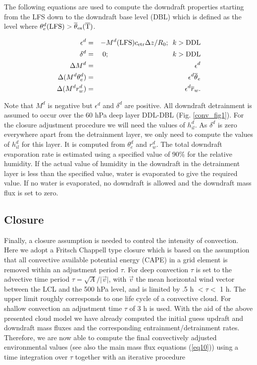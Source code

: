 The following equations are used to compute the downdraft properties
starting from the LFS down to the downdraft base level (DBL)
which is defined as the level where
$\theta_{e}^d(\rm{LFS}) >\overline{\theta}_{es}(\overline{T})$.


\begin{eqnarray}
\epsilon^d&=&-M^d({\rm LFS}) c_{\rm etr} \Delta z/R_0;\,\,\, k>{\rm DDL}\\
\delta^d&=&0; \quad\quad\quad\quad\quad\quad\quad\quad\quad\, k>{\rm DDL}\\
\Delta M^d&=&\epsilon^d\\
\Delta (M^d\theta_e^d)&=&\epsilon^d\overline{\theta}_e
\label{eqdt} \\
\Delta (M^d r_w^d)&=&\epsilon^d\overline{r}_w.
\label{eqdq}
\end{eqnarray}

\noindent
Note that $M^d$ is negative but $\epsilon^d$ and $\delta^d$ are positive.
All downdraft detrainment is assumed to occur over the 60 hPa
deep layer DDL-DBL (Fig. \ref{conv_fig1}).
For the closure adjustment procedure we will need the values of
$h_{il}^d$. As $\delta^d$ is zero everywhere apart from the
detrainment layer, we only
need to compute the values of $h_{il}^d$ for this layer. It is
computed from  $\theta_e^d$ and $r_w^d$.
The total downdraft evaporation rate is estimated using a specified
value of 90\% for the relative humidity. If the actual value
of humidity in the downdraft in the detrainment layer
is less than the specified
value, water is evaporated to give the required value. If no
water is evaporated, no downdraft is allowed and the
downdraft mass flux is set to zero.


\subsection{Closure}

Finally, a closure assumption is needed to control the intensity of
convection.  Here we adopt
a Fritsch Chappell type closure which is based on the assumption that all
convective available potential energy (CAPE) in a grid element is removed
within an adjustment period $\tau$. For deep convection $\tau$ is set
to the advective time period
$\tau=\sqrt{A}/\vert\vec v\vert$, with $\vec v$ the mean
horizontal wind vector between the LCL and the 500 hPa level, and is limited by
 .5 h $< \tau <$ 1 h. The upper limit roughly corresponds to one life cycle
 of a convective cloud.
For shallow convection an adjustment time $\tau$ of 3 h is used.
With the aid of the above presented cloud model we have already
computed the initial guess updraft and downdraft mass fluxes
and the corresponding
entrainment/detrainment rates. Therefore, we are now able to compute
the final convectively adjusted environmental values
(see also the main mass flux equations (\ref{eq10}))
using a time integration over $\tau$ together with an iterative procedure

